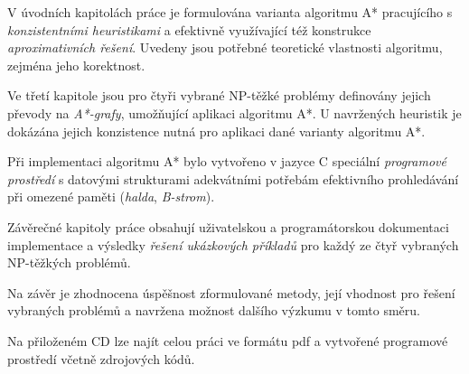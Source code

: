 \documentclass[12pt,notitlepage,fleqn]{report} %
\theoremstyle{definition}
\begin{document}
  V úvodních kapitolách práce je formulována varianta algoritmu A* pracujícího s \emph{konzistentními heuristikami} a efektivně využívající též konstrukce \emph{aproximativních řešení}. Uvedeny jsou potřebné teoretické vlastnosti algoritmu, zejména jeho korektnost.
  
  Ve třetí kapitole jsou pro čtyři vybrané NP-těžké problémy definovány jejich převody na \emph{A*-grafy}, umožňující aplikaci algoritmu A*. U navržených heuristik je dokázána jejich konzistence nutná pro aplikaci dané varianty algoritmu A*.
  
  Při implementaci algoritmu A* bylo vytvořeno v jazyce C speciální \emph{programové prostředí} s datovými strukturami adekvátními potřebám efektivního prohledávání při omezené paměti (\emph{halda}, \emph{B-strom}).
  
  Závěrečné kapitoly práce obsahují uživatelskou a programátorskou dokumentaci implementace a výsledky \emph{řešení ukázkových příkladů} pro každý ze čtyř vybraných NP-těžkých problémů.
  
  Na závěr je zhodnocena úspěšnost zformulované metody, její vhodnost pro řešení vybraných problémů a navržena možnost dalšího výzkumu v tomto směru.
  
  Na přiloženém CD lze najít celou práci ve formátu pdf a vytvořené programové prostředí včetně zdrojových kódů.

\end{document}
